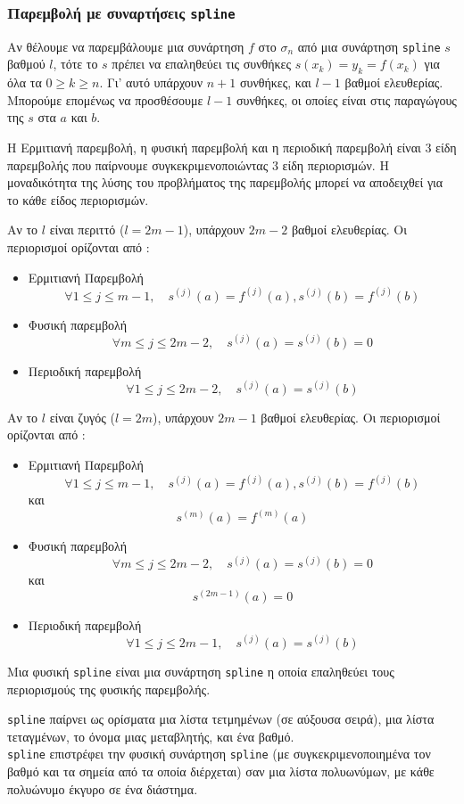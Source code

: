 \documentclass[a4paper,11pt]{book}
\newcommand{\en}{\selectlanguage{english}}
\begin{document}
\subsubsection{Παρεμβολή με συναρτήσεις {\en\tt spline}}
Αν θέλουμε να παρεμβάλουμε μια συνάρτηση $f$ στο $\sigma_n$ από μια συνάρτηση {\en\tt spline}
 $s$ βαθμού $l$, τότε το $s$ πρέπει να επαληθεύει τις συνθήκες $s(x_k)=y_k=f(x_k)$ για όλα τα 
$0\geq k\geq n$. Γι' αυτό υπάρχουν $n+1$ συνθήκες, και $l-1$ βαθμοί 
ελευθερίας. Μπορούμε επομένως να προσθέσουμε $l-1$ συνθήκες, οι οποίες είναι στις 
παραγώγους της $s$ στα $a$ και $b$.

Η Ερμιτιανή παρεμβολή, η φυσική παρεμβολή και η περιοδική παρεμβολή
είναι 3 είδη παρεμβολής που παίρνουμε συγκεκριμενοποιώντας 3 είδη 
περιορισμών. Η μοναδικότητα της λύσης  
του προβλήματος της παρεμβολής μπορεί να αποδειχθεί για το κάθε είδος
περιορισμών.

Αν το $l$ είναι περιττό ($l=2m-1$), υπάρχουν $2m-2$ βαθμοί
ελευθερίας. Οι περιορισμοί ορίζονται από :
\begin{itemize}
\item Ερμιτιανή Παρεμβολή
\[ \forall 1\leq j\leq m-1, \quad s^{(j)}(a)=f^{(j)}(a),
s^{(j)}(b)=f^{(j)}(b) \]
\item  Φυσική παρεμβολή
\[ \forall m \leq j \leq 2m-2, \quad s^{(j)}(a)=s^{(j)}(b)=0 \]
\item Περιοδική παρεμβολή 
\[\forall 1\leq j\leq 2m-2, \quad s^{(j)}(a)=s^{(j)}(b) \]
\end{itemize}

Αν το $l$ είναι ζυγός ($l=2m$), υπάρχουν $2m-1$ βαθμοί 
ελευθερίας. Οι περιορισμοί ορίζονται από :
\begin{itemize}
\item Ερμιτιανή Παρεμβολή
\[ \forall 1\leq j\leq m-1, \quad s^{(j)}(a)=f^{(j)}(a),
s^{(j)}(b)=f^{(j)}(b) \] 
και
\[s^{(m)}(a)=f^{(m)}(a)\] 
\item Φυσική παρεμβολή
\[ \forall m \leq j \leq 2m-2, \quad s^{(j)}(a)=s^{(j)}(b)=0 \]
και
\[s^{(2m-1)}(a)=0\] 
\item  Περιοδική παρεμβολή 
\[\forall 1\leq j\leq 2m-1, \quad s^{(j)}(a)=s^{(j)}(b) \]
\end{itemize}
Μια φυσική {\tt\textlatin{spline}} 
είναι μια συνάρτηση {\tt\textlatin{spline}} η οποία επαληθεύει τους περιορισμούς της φυσικής παρεμβολής.

{\en\tt spline} παίρνει ως ορίσματα μια λίστα τετμημένων (σε αύξουσα σειρά), 
μια λίστα τεταγμένων, το όνομα μιας μεταβλητής, και ένα βαθμό.\\
{\en\tt spline} επιστρέφει την φυσική συνάρτηση {\tt\textlatin{spline}} (με συγκεκριμενοποιημένα τον βαθμό
και τα σημεία από τα οποία διέρχεται) σαν μια λίστα πολυωνύμων, με κάθε
πολυώνυμο έκγυρο σε ένα διάστημα.
\end{document}
